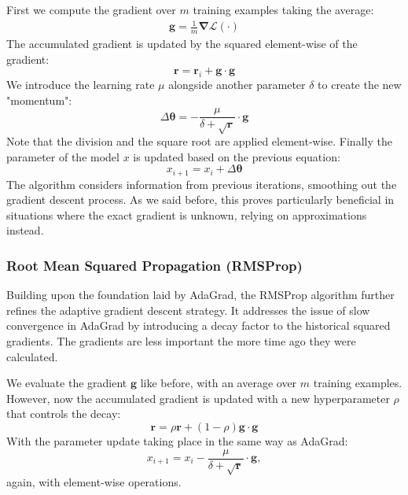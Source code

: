 \documentclass[]{article}
\theoremstyle{definition}
\begin{document}
First we compute the gradient over $m$ training examples taking the average:
\begin{align}
	\boldsymbol{g} = \frac{1}{m}\boldsymbol{\nabla}\mathcal{L(\cdot)} 
\end{align}
The accumulated gradient is updated by the squared element-wise of the gradient:
\begin{equation*}
	\boldsymbol{r} = \boldsymbol{r}_{i} + \boldsymbol{g} \cdot \boldsymbol{g}
\end{equation*}
We introduce the learning rate $\mu$ alongside another parameter $\delta$ to create the new "momentum":
\begin{equation*}
	\Delta\boldsymbol{\theta} = - \frac{\mu}{\delta+\sqrt{\boldsymbol{r}}} \cdot \boldsymbol{g} 
\end{equation*}
Note that the division and the square root are applied element-wise.
Finally the parameter of the model $x$ is updated based on the previous equation:
\begin{equation*}
	x_{i+1} = x_i + \Delta\boldsymbol{\theta}
	\end{equation*}
The algorithm considers information from previous iterations, smoothing out the gradient descent process. As we said before, this proves particularly beneficial in situations where the exact gradient is unknown, relying on approximations instead.

\subsubsection{Root Mean Squared Propagation (RMSProp)}
Building upon the foundation laid by AdaGrad, the RMSProp algorithm further refines the adaptive gradient descent strategy. It addresses the issue of slow convergence in AdaGrad by introducing a decay factor to the historical squared gradients. The gradients are less important the more time ago they were calculated. 

We evaluate the gradient $\boldsymbol{g}$ like before, with an average over $m$ training examples.
However, now the accumulated gradient is updated with a new hyperparameter $\rho$ that controls the decay:
\begin{equation*}
	\boldsymbol{r} = \rho\boldsymbol{r} + (1- \rho) \boldsymbol{g}\cdot\boldsymbol{g}
\end{equation*}
With the parameter update taking place in the same way as AdaGrad:
\begin{equation*}
	x_{i+1} = x_i - \frac{\mu}{\delta+\sqrt{\boldsymbol{r}}} \cdot \boldsymbol{g},
\end{equation*}
again, with element-wise operations.
\end{document}
